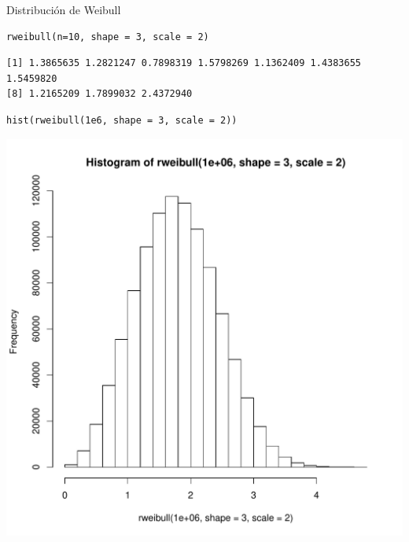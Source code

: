 \documentclass[xcolor={usenames,svgnames,dvipsnames}]{beamer}
\begin{document}
\begin{frame}[fragile,label=sec-3-6]{Distribución de Weibull}
 \lstset{language=R,label= ,caption= ,numbers=none}
\begin{lstlisting}
rweibull(n=10, shape = 3, scale = 2)
\end{lstlisting}

\begin{verbatim}
[1] 1.3865635 1.2821247 0.7898319 1.5798269 1.1362409 1.4383655 1.5459820
[8] 1.2165209 1.7899032 2.4372940
\end{verbatim}


\lstset{language=R,label= ,caption= ,numbers=none}
\begin{lstlisting}
hist(rweibull(1e6, shape = 3, scale = 2))
\end{lstlisting}

\includegraphics[height=0.6\textheight]{figs/rweibull.pdf}
\end{frame}
\end{document}
